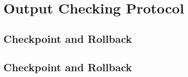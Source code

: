 \section{Output Checking Protocol} \label{sec:output}


\subsection{Checkpoint and Rollback} \label{sec:checkpoint}




\subsection{Checkpoint and Rollback} \label{sec:checkpoint}









